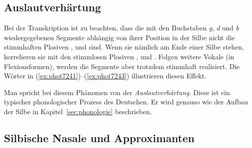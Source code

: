\subsection{Auslautverhärtung}

\label{sec:auslautverhaertungphonetik}


Bei der Transkription ist zu beachten, dass die mit den Buchstaben \textit{g}, \textit{d} und \textit{b} wiedergegebenen Segmente abhängig von ihrer Position in der Silbe nicht die stimmhaften Plosiven \textipa{[g]}, \textipa{[d]} und \textipa{[b]} sind.
Wenn sie nämlich am Ende einer Silbe stehen, korrelieren sie mit den stimmlosen Plosiven \textipa{[k]}, \textipa{[t]} und \textipa{[p]}.
Folgen weitere Vokale (\zB in Flexionsformen), werden die Segmente aber trotzdem stimmhaft realisiert.
Die Wörter in (\ref{ex:phot7241})--(\ref{ex:phot7243}) illustrieren diesen Effekt.

\begin{exe}
  \ex\label{ex:phot7241}
  \begin{xlist}
  \end{xlist}
  \ex\label{ex:phot7242}
  \begin{xlist}
  \end{xlist}
  \ex\label{ex:phot7243}
  \begin{xlist}
  \end{xlist}
\end{exe}

Man spricht bei diesem Phänomen von der \textit{Auslautverhärtung}.
Diese ist ein typischer phonologischer Prozess des Deutschen.
Er wird genauso wie der Aufbau der Silbe in Kapitel~\ref{sec:phonologie} beschrieben.

\subsection{Silbische Nasale und Approximanten}

\label{sec:silbischenasaleapproximanten}

